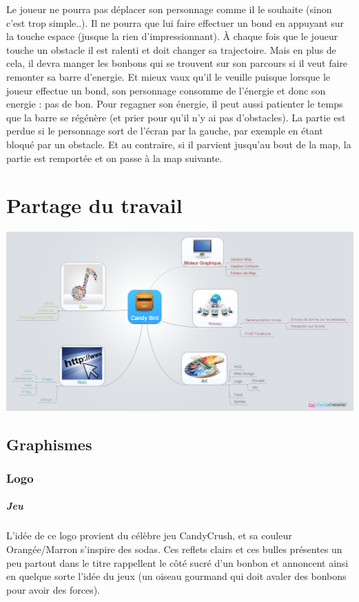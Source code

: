 \documentclass [11pt]{report}
\begin{document}
\indent Le joueur ne pourra pas déplacer son personnage comme il le souhaite (sinon c'est trop simple..). Il ne pourra que lui faire effectuer un bond en appuyant sur la touche espace (jusque la rien d'impressionnant). \`A chaque fois que le joueur touche un obstacle il est ralenti et doit changer sa trajectoire. Mais en plus de cela, il devra manger les bonbons qui se trouvent sur son parcours si il veut faire remonter sa barre d'energie. Et mieux vaux qu'il le veuille puisque lorsque le joueur effectue un bond, son personnage consomme de l'énergie et donc son energie : pas de bon. Pour regagner son énergie, il peut aussi patienter le temps que la barre se régénère (et prier pour qu'il n'y ai pas d'obstacles). La partie est perdue si le personnage sort de l'écran par la gauche, par exemple en étant bloqué par un obstacle. Et au contraire, si il parvient jusqu'au bout de la map, la partie est remportée et on passe à la map suivante.
\newpage 


\chapter {Partage du travail}
\begin{center}
\includegraphics[scale=0.3]{images/Candy_Bird.png}
\end{center}

\newpage 

	


	\section{Graphismes}
		\subsection {Logo}
			\paragraph{Jeu}
			L'idée de ce logo provient du célèbre jeu CandyCrush, et sa couleur Orangée/Marron s'inspire des sodas. Ces reflets clairs et ces bulles présentes un peu partout dans le titre rappellent le côté sucré d'un bonbon et annoncent ainsi en quelque sorte l'idée du jeux (un oiseau gourmand qui doit avaler des bonbons pour avoir des forces). 
\end{document}
